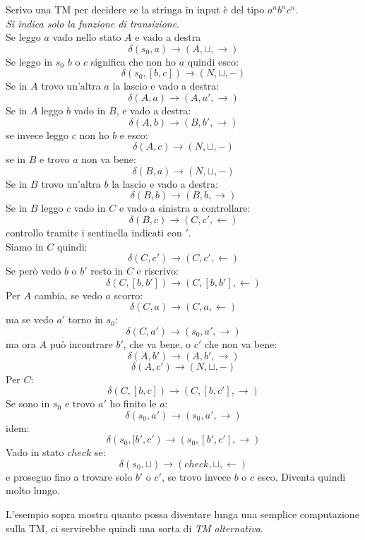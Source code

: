 \begin{esempio}
  Scrivo una TM per decidere se la stringa in input è del tipo $a^nb^nc^n$.\\
  \textit{Si indica solo la funzione di transizione}.\\
  Se leggo $a$ vado nello stato $A$ e vado a destra
  \[\delta(s_0,a)\to (A,\sqcup, \rightarrow)\]
  Se leggo in $s_0$ $b$ o $c$ significa che non ho $a$ quindi esco:
  \[\delta(s_0,[b,c])\to (N,\sqcup, -)\]
  Se in $A$ trovo un'altra $a$ la lascio e vado a destra:
  \[\delta(A,a)\to (A,a', \rightarrow)\]
  Se in $A$ leggo $b$ vado in $B$, e vado a destra:
  \[\delta(A,b)\to (B,b', \rightarrow)\]
  se invece leggo $c$ non ho $b$ e esco:
  \[\delta(A,c)\to (N,\sqcup, -)\]
  se in $B$ e trovo $a$ non va bene:
  \[\delta(B,a)\to (N,\sqcup, -)\]
  Se in $B$ trovo un'altra $b$ la lascio e vado a destra:
  \[\delta(B,b)\to (B,b, \rightarrow)\]
  Se in $B$ leggo $c$ vado in $C$ e vado a sinistra a controllare:
  \[\delta(B,c)\to (C,c', \leftarrow)\]
  controllo tramite i sentinella indicati con $'$.\\
  Siamo in $C$ quindi:
  \[\delta(C,c')\to (C,c', \leftarrow)\]
  Se però vedo $b$ o $b'$ resto in $C$ e riscrivo:
  \[\delta(C,[b,b'])\to (C,[b,b'], \leftarrow)\]
  Per $A$ cambia, se vedo $a$ scorro:
  \[\delta(C,a)\to (C,a, \leftarrow)\]
  ma se vedo $a'$ torno in $s_0$:
  \[\delta(C,a')\to (s_0,a', \rightarrow)\]
  ma ora $A$ può incontrare $b'$, che va bene, o $c'$ che non va bene:
  \[\delta(A,b')\to (A,b', \rightarrow)\]
  \[\delta(A,c')\to (N,\sqcup, -)\]
  Per $C$:
  \[\delta(C,[b,c])\to (C,[b,c'], \rightarrow)\]
  Se sono in $s_0$ e trovo $a'$ ho finito le $a$:
  \[\delta(s_0,a')\to (s_0,a' , \rightarrow)\]
  idem:
  \[\delta(s_0,[b',c')\to (s_0,[b',c'] , \rightarrow)\]
  Vado in stato $check$ se:
  \[\delta(s_0,\sqcup)\to(check,\sqcup, \leftarrow)\]
  e proseguo fino a trovare solo $b'$ o $c'$, se trovo invece $b$ o $c$ esco.
  Diventa quindi molto lungo.
\end{esempio}
L'esempio sopra mostra quanto possa diventare lunga una semplice computazione
sulla TM, ci servirebbe quindi una sorta di \textit{TM alternativa}.
